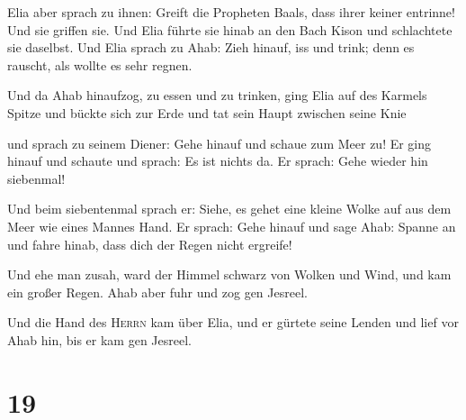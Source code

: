  Elia aber sprach zu ihnen: Greift die Propheten Baals,
dass ihrer keiner entrinne! Und sie griffen sie. Und Elia führte sie
hinab an den Bach Kison und schlachtete sie daselbst. 
Und Elia sprach zu Ahab: Zieh hinauf, iss und trink; denn es rauscht,
als wollte es sehr regnen.

 Und da Ahab hinaufzog, zu essen und zu trinken, ging
Elia auf des Karmels Spitze und bückte sich zur Erde und tat sein Haupt
zwischen seine Knie

 und sprach zu seinem Diener: Gehe hinauf und schaue zum
Meer zu! Er ging hinauf und schaute und sprach: Es ist nichts da. Er
sprach: Gehe wieder hin siebenmal!

 Und beim siebentenmal sprach er: Siehe, es gehet eine
kleine Wolke auf aus dem Meer wie eines Mannes Hand. Er sprach: Gehe
hinauf und sage Ahab: Spanne an und fahre hinab, dass dich der Regen
nicht ergreife!

 Und ehe man zusah, ward der Himmel schwarz von Wolken
und Wind, und kam ein großer Regen. Ahab aber fuhr und zog gen Jesreel.

 Und die Hand des \textsc{Herrn} kam über Elia, und er
gürtete seine Lenden und lief vor Ahab hin, bis er kam gen Jesreel.

\hypertarget{section-18}{%
\section{19}\label{section-18}}

